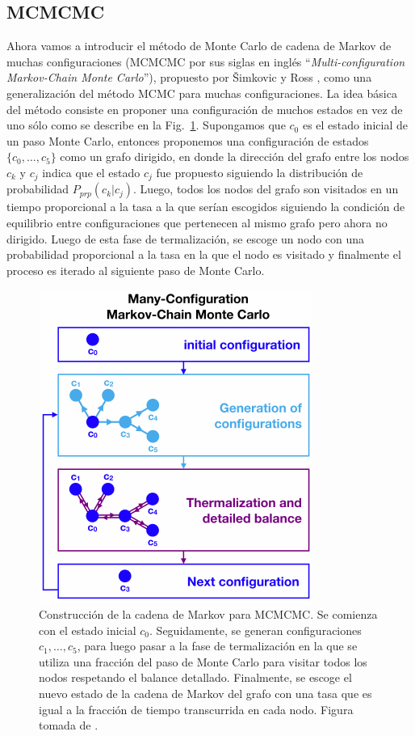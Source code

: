 \documentclass[letterpaper,superscriptaddress,aps,pra,nolongbibliography,twocolumn,showpacs,floatfix,10pt]{revtex4-2} %
\renewcommand{\>}{\rangle}
\newcommand{\<}{\langle}
\newcommand{\Fref}[1]{Fig.~\ref{#1}}
\begin{document}
\subsection{MCMCMC}
Ahora vamos a introducir el método de Monte Carlo de cadena de Markov
de muchas configuraciones (MCMCMC por sus siglas en inglés 
``\textit{Multi-configuration Markov-Chain Monte Carlo}''), 
propuesto por Šimkovic y Ross \cite{simkovic2021manyconfiguration}, 
como una generalización del método MCMC para muchas configuraciones. 
La idea básica del método consiste en proponer una configuración de muchos
estados en vez de uno sólo como se describe en la \Fref{fig:mcmcmc_algorithm}.
Supongamos que $c_0$ es el estado inicial de un paso Monte Carlo, entonces
proponemos una configuración de estados $\{ c_0,\ldots, c_5 \}$ como un grafo
dirigido, en donde la dirección del grafo entre los nodos $c_k$ y $c_j$ 
indica que el estado $c_j$ fue propuesto siguiendo la distribución de probabilidad
$P_{prp}(c_k|c_j)$. Luego, todos los nodos del grafo son visitados 
en un tiempo proporcional a la tasa a la que serían 
escogidos siguiendo la condición de equilibrio entre configuraciones
que pertenecen al mismo grafo pero ahora no dirigido. Luego de 
esta fase de termalización, se escoge un nodo con una probabilidad
proporcional a la tasa en la que el nodo es visitado y finalmente el 
proceso es iterado al siguiente paso de Monte Carlo. 

\begin{figure}
\includegraphics[width=0.7\columnwidth]{mcmcmc}
\caption{Construcción de la cadena de Markov para MCMCMC.
Se comienza con el estado inicial $c_0$. Seguidamente, se generan 
configuraciones $c_1,\ldots,c_5$, para luego pasar a la fase de termalización
en la que se utiliza una fracción del paso de Monte Carlo para visitar 
todos los nodos respetando el balance detallado. Finalmente, se escoge
el nuevo estado de la cadena de Markov del grafo con una tasa
que es igual a la fracción de tiempo transcurrida en cada nodo.
Figura tomada de \cite{simkovic2021manyconfiguration}.}
\label{fig:mcmcmc_algorithm}
\end{figure}
\end{document}
